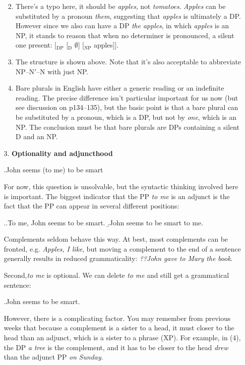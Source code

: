 \documentclass[a4paper,12pt]{article}
\newcommand{\lbl}[1]{\ensuremath{_{\scriptstyle\mathrm{#1}}}}
\begin{document}
\begin{enumerate}
\begin{enumerate}[label=(\roman*)]
\newpage
            \item There's a typo here, it should be \textit{apples}, not \textit{tomatoes}. \textit{Apples} can be substituted by a pronoun \textit {them}, suggesting that \textit{apples} is ultimately a DP. However since we also can have a DP \textit{the apples}, in which \textit{apples} is an NP, it stands to reason that when no determiner is pronounced, a silent one present: [\lbl{DP} [\lbl{D} $\emptyset$] [\lbl{NP} apples]].

            \item The structure is shown above. Note that it's also acceptable to abbreviate NP--N$'$--N with just NP.

            \item Bare plurals in English have either a generic reading or an indefinite reading. The precise difference isn't particular important for us now (but see discussion on p134--135), but the basic point is that a bare plural can be substituted by a pronoun, which is a DP, but not by \textit{one}, which is an NP. The conclusion must be that bare plurals are DPs containing a silent D and an NP.

		\end{enumerate}
	
    \item[3.]\textbf{Optionality and adjuncthood}
    \setcounter{ExNo}{0}

    	\ex.John seems (to me) to be smart
    	
    	For now, this question is unsolvable, but the syntactic thinking involved here is important. The biggest indicator that the PP \textit{to me} is an adjunct is the fact that the PP can appear in several different positions:

		\ex.\a.To me, John seems to be smart.
        	\b.John seems to be smart to me.

        Complements seldom behave this way. At best, most complements can be fronted, e.g. \textit{Apples, I like}, but moving a  complement to the end of a sentence generally results in reduced grammaticality: \textit{??John gave to Mary the book}.

		Second,\textit{to me} is optional. We can delete \textit{to me} and still get a grammatical sentence:

		\ex.John seems to be smart.

		However, there is a complicating factor. You may remember from previous weeks that because a complement is a sister to a head, it must closer to the head than an adjunct, which is a sister to a phrase (XP). For example, in (4), the DP \textit{a tree} is the complement, and it has to be closer to the head \textit{drew} than the adjunct PP \textit{on Sunday}.


\end{enumerate}
\end{document}
